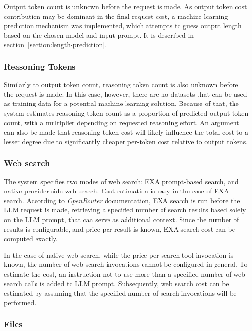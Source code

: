 \documentclass[a4paper,11pt,twoside]{report}
\theoremstyle{definition}
\begin{document}
Output token count is unknown before the request is made. As output token cost contribution may be dominant in the final request cost, a machine learning prediction mechanism was implemented, which attempts to guess output length based on the chosen model and input prompt. It is described in section~\ref{section:length-prediction}.

\subsubsection{Reasoning Tokens}

Similarly to output token count, reasoning token count is also unknown before the request is made. In this case, however, there are no datasets that can be used as training data for a potential machine learning solution. Because of that, the system estimates reasoning token count as a proportion of predicted output token count, with a multiplier depending on requested reasoning effort. An argument can also be made that reasoning token cost will likely influence the total cost to a lesser degree due to significantly cheaper per-token cost relative to output tokens. 

\subsubsection{Web search}

The system specifies two modes of web search: EXA prompt-based search, and native provider-side web search. Cost estimation is easy in the case of EXA search. According to \textit{OpenRouter} documentation, EXA search is run before the LLM request is made, retrieving a specified number of search results based solely on the LLM prompt, that can serve as additional context. Since the number of results is configurable, and price per result is known, EXA search cost can be computed exactly.

In the case of native web search, while the price per search tool invocation is known, the number of web search invocations cannot be configured in general. To estimate the cost, an instruction not to use more than a specified number of web search calls is added to LLM prompt. Subsequently, web search cost can be estimated by assuming that the specified number of search invocations will be performed.

\subsubsection{Files}
\end{document}
